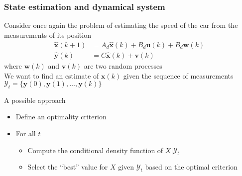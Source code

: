 \begin{frame}
	\frametitle{State estimation and dynamical system}
	Consider once again the problem of estimating the speed of the car from the measurements of its position
	\begin{align*}
	\hat{\bm{x}}(k+1) &= A_d \hat{\bm{x}}(k) + B_d \bm{u}(k) + B_d \bm{w}(k)\\
	\hat{\bm{y}}(k) &= C\hat{\bm{x}}(k) + \bm{v}(k)
	\end{align*}
	where $\bm{w}(k)$ and $\bm{v}(k)$ are two random processes\\\vspace{0.5em}
	We want to find an estimate of $\bm{x}(k)$ given the sequence of measurements $\mathcal{Y}_t=\{\bm{y}(0),\bm{y}(1),\ldots,\bm{y}(k)\}$
	
	 A possible approach
	\begin{itemize}
		\item Define an optimality criterion
		\item For all $t$
		\begin{itemize}
			\item Compute the conditional density function of $X|\mathcal{Y}_t$ 
			\item Select the ``best'' value for $X$ given $\mathcal{Y}_t$ based on the optimal criterion
		\end{itemize}
	\end{itemize}
\end{frame}

